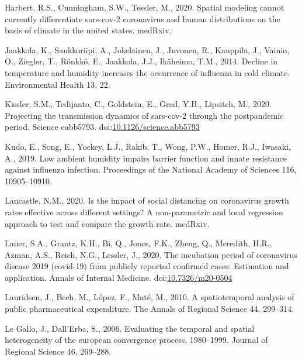 \documentclass[]{elsarticle} %
\begin{document}
\leavevmode\hypertarget{ref-Harbert2020spatial}{}%
Harbert, R.S., Cunningham, S.W., Tessler, M., 2020. Spatial modeling
cannot currently differentiate sars-cov-2 coronavirus and human
distributions on the basis of climate in the united states. medRxiv.

\leavevmode\hypertarget{ref-Jaakkola2014decline}{}%
Jaakkola, K., Saukkoriipi, A., Jokelainen, J., Juvonen, R., Kauppila,
J., Vainio, O., Ziegler, T., Rönkkö, E., Jaakkola, J.J., Ikäheimo, T.M.,
2014. Decline in temperature and humidity increases the occurrence of
influenza in cold climate. Environmental Health 13, 22.

\leavevmode\hypertarget{ref-Kissler2020projecting}{}%
Kissler, S.M., Tedijanto, C., Goldstein, E., Grad, Y.H., Lipsitch, M.,
2020. Projecting the transmission dynamics of sars-cov-2 through the
postpandemic period. Science eabb5793.
doi:\href{https://doi.org/10.1126/science.abb5793}{10.1126/science.abb5793}

\leavevmode\hypertarget{ref-Kudo2019low}{}%
Kudo, E., Song, E., Yockey, L.J., Rakib, T., Wong, P.W., Homer, R.J.,
Iwasaki, A., 2019. Low ambient humidity impairs barrier function and
innate resistance against influenza infection. Proceedings of the
National Academy of Sciences 116, 10905--10910.

\leavevmode\hypertarget{ref-Lancastle2020impact}{}%
Lancastle, N.M., 2020. Is the impact of social distancing on coronavirus
growth rates effective across different settings? A non-parametric and
local regression approach to test and compare the growth rate. medRxiv.

\leavevmode\hypertarget{ref-Lauer2020incubation}{}%
Lauer, S.A., Grantz, K.H., Bi, Q., Jones, F.K., Zheng, Q., Meredith,
H.R., Azman, A.S., Reich, N.G., Lessler, J., 2020. The incubation period
of coronavirus disease 2019 (covid-19) from publicly reported confirmed
cases: Estimation and application. Annals of Internal Medicine.
doi:\href{https://doi.org/10.7326/m20-0504}{10.7326/m20-0504}

\leavevmode\hypertarget{ref-Lauridsen2010spatiotemporal}{}%
Lauridsen, J., Bech, M., López, F., Maté, M., 2010. A spatiotemporal
analysis of public pharmaceutical expenditure. The Annals of Regional
Science 44, 299--314.

\leavevmode\hypertarget{ref-Legallo2006evaluating}{}%
Le Gallo, J., Dall'Erba, S., 2006. Evaluating the temporal and spatial
heterogeneity of the european convergence process, 1980--1999. Journal
of Regional Science 46, 269--288.
\end{document}
